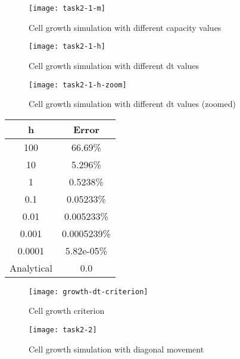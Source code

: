 \clearpage

\begin{figure}[ht]
    \centering
    \texttt{[image: task2-1-m]}
    \caption[Cell growth simulation with different capacity values]{Cell growth simulation with different capacity values}
    \label{fig:task2-1-m}
\end{figure}

\clearpage

\begin{figure}[ht]
    \centering
    \texttt{[image: task2-1-h]}
    \caption[Cell growth simulation with different dt values]{Cell growth simulation with different dt values}
    \label{fig:task2-1-h}
\end{figure}

\begin{figure}[ht]
    \centering
    \texttt{[image: task2-1-h-zoom]}
    \caption[Cell growth simulation with different dt values (zoomed)]{Cell growth simulation with different dt values (zoomed)}
    \label{fig:task2-1-h-zoom}
\end{figure}

\begin{center}
\begin{tabular}{c | c} 
    h & Error \\
    \hline
    100 & 66.69\% \\
    10 & 5.296\% \\
    1 & 0.5238\% \\
    0.1 & 0.05233\% \\
    0.01 & 0.005233\% \\
    0.001 & 0.0005239\% \\
    0.0001 & 5.82e-05\% \\
    Analytical & 0.0 \\
\end{tabular}
\end{center}

\clearpage

\begin{figure}[ht]
    \centering
    \texttt{[image: growth-dt-criterion]}
    \caption[Cell growth criterion]{Cell growth criterion}
    \label{fig:growth-dt-criterion}
\end{figure}

\clearpage

\begin{figure}[ht]
    \centering
    \texttt{[image: task2-2]}
    \caption[Cell growth simulation with diagonal movement]{Cell growth simulation with diagonal movement}
    \label{fig:task2-2}
\end{figure}

